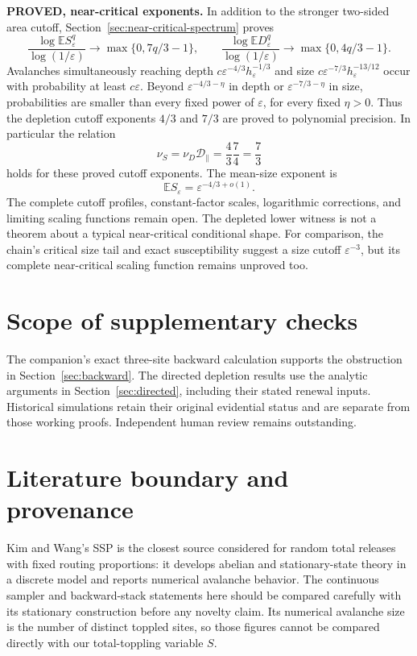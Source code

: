 \documentclass[11pt]{article}
\numberwithin{equation}{section}
\theoremstyle{definition}
\newcommand{\E}{\mathbb E}
\newcommand{\status}[1]{\textsf{\textbf{#1}}}
\begin{document}
\status{PROVED, near-critical exponents.} In addition to the stronger two-sided area cutoff, Section~\ref{sec:near-critical-spectrum} proves
\[
 \frac{\log\E S_\varepsilon^q}{\log(1/\varepsilon)}\longrightarrow
 \max\{0,7q/3-1\},\qquad
 \frac{\log\E D_\varepsilon^q}{\log(1/\varepsilon)}\longrightarrow
 \max\{0,4q/3-1\}.
\]
Avalanches simultaneously reaching depth $c\varepsilon^{-4/3}h_\varepsilon^{-1/3}$ and size $c\varepsilon^{-7/3}h_\varepsilon^{-13/12}$ occur with probability at least $c\varepsilon$. Beyond $\varepsilon^{-4/3-\eta}$ in depth or $\varepsilon^{-7/3-\eta}$ in size, probabilities are smaller than every fixed power of $\varepsilon$, for every fixed $\eta>0$. Thus the depletion cutoff exponents $4/3$ and $7/3$ are proved to polynomial precision. In particular the relation
\[
 \nu_S=\nu_D\mathcal D_\parallel=\frac43\frac74=\frac73
\]
holds for these proved cutoff exponents. The mean-size exponent is
\begin{equation}\label{eq:lattice-susceptibility-prediction}
 \E S_\varepsilon=\varepsilon^{-4/3+o(1)}.
\end{equation}
The complete cutoff profiles, constant-factor scales, logarithmic corrections, and limiting scaling functions remain open. The depleted lower witness is not a theorem about a typical near-critical conditional shape. For comparison, the chain's critical size tail and exact susceptibility suggest a size cutoff $\varepsilon^{-3}$, but its complete near-critical scaling function remains unproved too.


\section{Scope of supplementary checks}\label{sec:failures}\label{sec:numerics}
The companion's exact three-site backward calculation supports the obstruction
in Section~\ref{sec:backward}. The directed depletion results use the analytic
arguments in Section~\ref{sec:directed}, including their stated renewal inputs.
Historical simulations retain their original evidential status and are separate
from those working proofs. Independent human review remains outstanding.
\section{Literature boundary and provenance}\label{sec:literature}

Kim and Wang's SSP \cite{KW} is the closest source considered for random total releases with fixed routing proportions: it develops abelian and stationary-state theory in a discrete model and reports numerical avalanche behavior. The continuous sampler and backward-stack statements here should be compared carefully with its stationary construction before any novelty claim. Its numerical avalanche size is the number of distinct toppled sites, so those figures cannot be compared directly with our total-toppling variable $S$.
\end{document}
